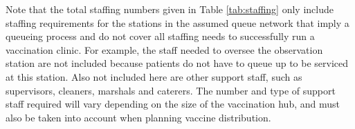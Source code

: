 \documentclass{article}
\begin{document}
\begin{table}[!h]

\caption{\label{tab:staffing}Staff numbers by station for low, medium and high staffing availability}
\end{table}

Note that the total staffing numbers given in Table \ref{tab:staffing}
only include staffing requirements for the stations in the assumed queue
network that imply a queueing process and do not cover all staffing
needs to successfully run a vaccination clinic. For example, the staff
needed to oversee the observation station are not included because
patients do not have to queue up to be serviced at this station. Also
not included here are other support staff, such as supervisors,
cleaners, marshals and caterers. The number and type of support staff
required will vary depending on the size of the vaccination hub, and
must also be taken into account when planning vaccine distribution.
\end{document}
